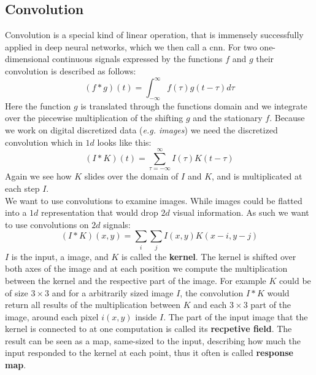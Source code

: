 \subsection{Convolution} %
\label{sub:conepts:nn:conv}
Convolution is a special kind of linear operation, that is immensely successfully applied in deep neural networks, which we then call a \acrfull{cnn}. For two one-dimensional continuous signals expressed by the functions $f$ and $g$ their convolution is described as follows:
\begin{equation}
    (f * g)(t) = \int_{-\infty}^\infty f(\tau)g(t - \tau)d\tau
\end{equation}
Here the function $g$ is translated through the functions domain and we integrate over the piecewise multiplication of the shifting $g$ and the stationary $f$.
Because we work on digital discretized data (\textit{e.g. images}) we need the discretized convolution which in $1d$ looks like this:
\begin{equation}
    (I * K)(t)  = \sum_{\tau = - \infty}^\infty I(\tau)K(t - \tau)
\end{equation}
Again we see how $K$ slides over the domain of $I$ and $K$, and is multiplicated at each step $I$.\\
We want to use convolutions to examine images. While images could be flatted into a $1d$ representation that would drop $2d$ visual information. As such we want to use convolutions on $2d$ signals:
\begin{equation}
    (I * K)(x,y)  = \sum_i\sum_j I(x,y)K(x-i,y-j)
\end{equation}
$I$ is the input, a image, and $K$ is called the \textbf{kernel}. The kernel is shifted over both axes of the image and at each position we compute the multiplication between the kernel and the respective part of the image. For example $K$ could be of size $3\times 3$ and for a arbitrarily sized image $I$, the convolution $I * K$ would return all results of the multiplication between $K$ and each $3\times 3$ part of the image, around each pixel $i(x,y)$ inside $I$. The part of the input image that the kernel is connected to at one computation is called its \textbf{recpetive field}. The result can be seen as  a map, same-sized to the input, describing how much the input responded to the kernel at each point, thus it often is called \textbf{response map}.

